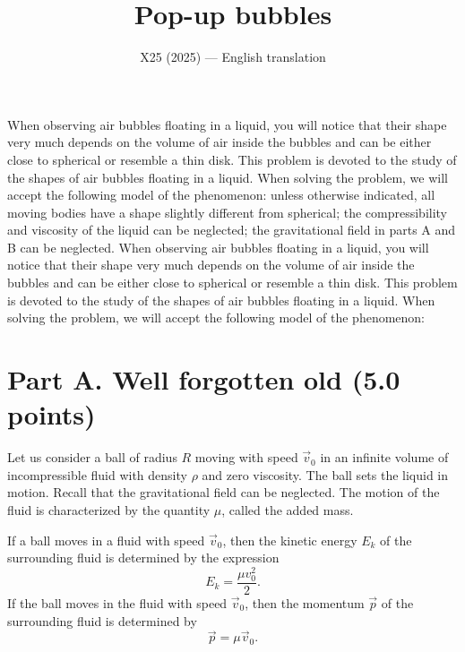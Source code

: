 \documentclass[11pt,a4paper]{article}
\title{\textbf{Pop-up bubbles}}
\author{\normalsize X25 (2025) — English translation}
\date{}
\begin{document}
\maketitle
When observing air bubbles floating in a liquid, you will notice that their shape very much depends on the volume of air inside the bubbles and can be either close to spherical or resemble a thin disk. This problem is devoted to the study of the shapes of air bubbles floating in a liquid. When solving the problem, we will accept the following model of the phenomenon: unless otherwise indicated, all moving bodies have a shape slightly different from spherical; the compressibility and viscosity of the liquid can be neglected; the gravitational field in parts A and B can be neglected.
When observing air bubbles floating in a liquid, you will notice that their shape very much depends on the volume of air inside the bubbles and can be either close to spherical or resemble a thin disk. This problem is devoted to the study of the shapes of air bubbles floating in a liquid. When solving the problem, we will accept the following model of the phenomenon:
\section*{Part A. Well forgotten old (5.0 points)}
Let us consider a ball of radius $R$ moving with speed $\vec{v}_0$ in an infinite volume of incompressible fluid with density $\rho$ and zero viscosity. The ball sets the liquid in motion. Recall that the gravitational field can be neglected. The motion of the fluid is characterized by the quantity $\mu$, called the added mass.

If a ball moves in a fluid with speed $\vec{v}_0$, then the kinetic energy $E_k$ of the surrounding fluid is determined by the expression
\[
E_k=\frac{\mu v_0^2}{2}.
\]
If the ball moves in the fluid with speed $\vec{v}_0$, then the momentum $\vec{p}$ of the surrounding fluid is determined by
\[
\vec{p}=\mu\vec{v}_0.
\]
\end{document}
